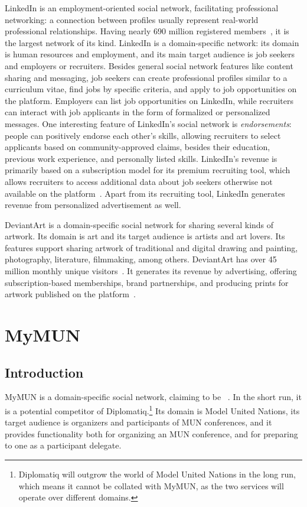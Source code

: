 LinkedIn is an employment-oriented social network, facilitating professional networking: a connection between profiles usually represent real-world professional relationships. Having nearly 690 million registered members~\cite{about-linkedin}, it is the largest network of its kind. LinkedIn is a domain-specific network: its domain is human resources and employment, and its main target audience is job seekers and employers or recruiters. Besides general social network features like content sharing and messaging, job seekers can create professional profiles similar to a curriculum vitae, find jobs by specific criteria, and apply to job opportunities on the platform. Employers can list job opportunities on LinkedIn, while recruiters can interact with job applicants in the form of formalized or personalized messages. One interesting feature of LinkedIn's social network is \emph{endorsements}: people can positively endorse each other's skills, allowing recruiters to select applicants based on community-approved claims, besides their education, previous work experience, and personally listed skills. LinkedIn's revenue is primarily based on a subscription model for its premium recruiting tool, which allows recruiters to access additional data about job seekers otherwise not available on the platform~\cite{linkedin-business-model}. Apart from its recruiting tool, LinkedIn generates revenue from personalized advertisement as well.

DeviantArt is a domain-specific social network for sharing several kinds of artwork. Its domain is art and its target audience is artists and art lovers. Its features support sharing artwork of traditional and digital drawing and painting, photography, literature, filmmaking, among others. DeviantArt has over 45 million monthly unique visitors~\cite{about-deviantart}. It generates its revenue by advertising, offering subscription-based memberships, brand partnerships, and producing prints for artwork published on the platform~\cite{deviantart-revenue}.

\section{MyMUN}
\label{section:mymun}

\subsection{Introduction}

MyMUN is a domain-specific social network, claiming to be ~\cite{mymunwebsite}. In the short run, it is a potential competitor of Diplomatiq.\footnote{Diplomatiq will outgrow the world of Model United Nations in the long run, which means it cannot be collated with MyMUN, as the two services will operate over different domains.} Its domain is Model United Nations, its target audience is organizers and participants of MUN conferences, and it provides functionality both for organizing an MUN conference, and for preparing to one as a participant delegate.

